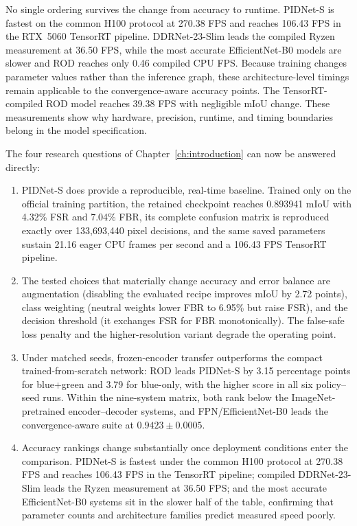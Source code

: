 No single ordering survives the change from accuracy to runtime. PIDNet-S is
fastest on the common H100 protocol at 270.38 FPS and reaches 106.43 FPS in the
RTX~5060 TensorRT pipeline. DDRNet-23-Slim leads the compiled Ryzen measurement
at 36.50 FPS, while the most accurate EfficientNet-B0 models are slower and ROD
reaches only 0.46 compiled CPU FPS.
Because training changes parameter values rather than the inference graph,
these architecture-level timings remain applicable to the convergence-aware
accuracy points.
The TensorRT-compiled ROD model reaches 39.38 FPS with negligible mIoU change. These measurements
show why hardware, precision, runtime, and timing boundaries belong in the
model specification.

The four research questions of Chapter~\ref{ch:introduction} can now be
answered directly:
\begin{enumerate}
  \item PIDNet-S does provide a reproducible, real-time baseline. Trained only
  on the official training partition, the retained checkpoint reaches
  0.893941 mIoU with 4.32\% FSR and 7.04\% FBR, its complete confusion matrix
  is reproduced exactly over 133,693,440 pixel decisions, and the same saved
  parameters sustain 21.16 eager CPU frames per second and a 106.43 FPS
  TensorRT pipeline.
  \item The tested choices that materially change accuracy and error balance
  are augmentation (disabling the evaluated recipe improves mIoU by 2.72
  points), class weighting (neutral weights lower FBR to 6.95\% but raise
  FSR), and the decision threshold (it exchanges FSR for FBR monotonically).
  The false-safe loss penalty and the higher-resolution variant degrade the
  operating point.
  \item Under matched seeds, frozen-encoder transfer outperforms the compact
  trained-from-scratch network: ROD leads PIDNet-S by 3.15 percentage points
  for blue+green and 3.79 for blue-only, with the higher score in all six
  policy--seed runs. Within the nine-system matrix, both rank below the
  ImageNet-pretrained encoder--decoder systems, and FPN/EfficientNet-B0 leads
  the convergence-aware suite at $0.9423\pm0.0005$.
  \item Accuracy rankings change substantially once deployment conditions
  enter the comparison. PIDNet-S is fastest under the common H100 protocol at
  270.38 FPS and reaches 106.43 FPS in the TensorRT pipeline; compiled
  DDRNet-23-Slim leads the Ryzen measurement at 36.50 FPS; and the most
  accurate EfficientNet-B0 systems sit in the slower half of the table,
  confirming that parameter counts and architecture families predict measured
  speed poorly.
\end{enumerate}

